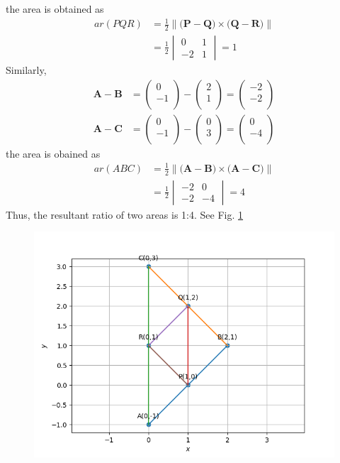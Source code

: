 \documentclass[12pt]{article}
\newcommand{\mydet}[1]{\ensuremath{\begin{vmatrix}#1\end{vmatrix}}}
\providecommand{\norm}[1]{\left\lVert#1\right\rVert}
\newcommand{\myvec}[1]{\ensuremath{\begin{pmatrix}#1\end{pmatrix}}}
\let\vec\mathbf
\begin{document}
	the area is obtained as
	\begin{align}
		ar(PQR)&=\frac{1}{2}{\norm{\vec(\vec{P}-\vec{Q})\times\vec(\vec{Q}-\vec{R})}}
		\\
		&=\frac{1}{2}\mydet{0 & 1\\-2 & 1}
		=1
	\end{align}
	Similarly, 
	\begin{align}
		\vec{A}-\vec{B} &=  \myvec{
  0 \\
  -1 \\
 } - \myvec{
  2 \\
  1 \\
 } = \myvec{
 -2 \\
 -2 \\
 }
 \\
		\vec{A}-\vec{C} &=  \myvec{
  0 \\
  -1 \\
 } - \myvec{
  0 \\
  3 \\
 } = \myvec{
 0 \\
 -4 \\
 }
	\end{align}
 the area is obained as
	\begin{align}
		ar(ABC)&=\frac{1}{2}{\norm{\vec(\vec{A}-\vec{B})\times\vec(\vec{A}-\vec{C})}}\\
		&=\frac{1}{2}\mydet{-2 & 0\\-2 & -4}
=4
	\end{align}
	Thus, the resultant ratio of two areas is 1:4.
	See Fig.
\ref{fig:10/7/3/3Fig}
\begin{figure}[!h]
	\begin{center} 
	    \includegraphics[width=\columnwidth]{chapters/10/7/3/3/figs/trigraph.png}
	\end{center}
\caption{}
\label{fig:10/7/3/3Fig}
\end{figure}
\end{document}

